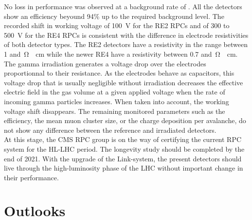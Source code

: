 	No loss in performance was observed at a background rate of . All the detectors show an efficiency beyound 94\% up to the required background level. The recorded shift in working voltage of \SI{100}{V} for the RE2 RPCs and of 300 to \SI{500}{V} for the RE4 RPCs is consistent with the difference in electrode resistivities of both detector types. The RE2 detectors have a resistivity in the range between 1 and \,\si{\ohm\cdot cm} while the newer RE4 have a resistivity between 0.7 and \,\si{\ohm\cdot cm}. The gamma irradiation generates a voltage drop over the electrodes proportionnal to their resistance. As the electrodes behave as capacitors, this voltage drop that is usually negligible without irradiation decreases the effective electric field in the gas volume at a given applied voltage when the rate of incoming gamma particles increases. When taken into account, the working voltage shift disappears. The remaining monitored parameters such as the efficiency, the mean muon cluster size, or the charge deposition per avalanche, do not show any difference between the reference and irradiated detectors.\\
	At this stage, the CMS RPC group is on the way of certifying the current RPC system for the HL-LHC period. The longevity study should be completed by the end of 2021. With the upgrade of the Link-system, the present detectors should live through the high-luminosity phase of the LHC without important change in their performance.

	\section{Outlooks}
	\label{chapt7:sec:outlooks}
	
